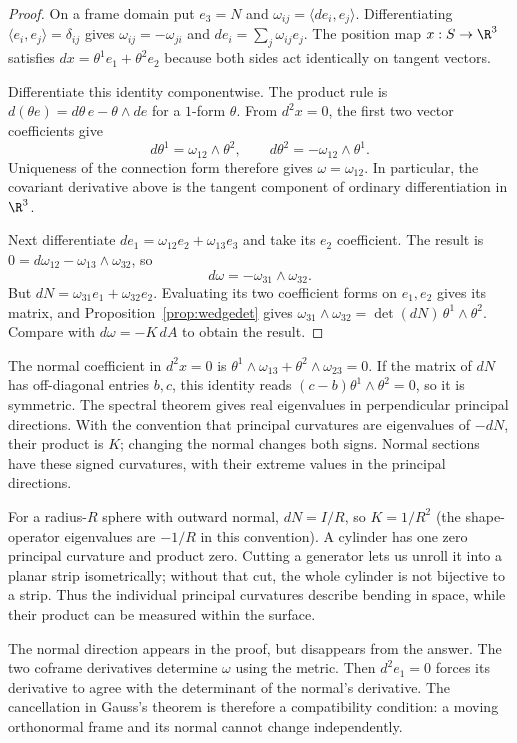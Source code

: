 \begin{proof}
On a frame domain put $e_3=N$ and $\omega_{ij}=\langle de_i,e_j\rangle$. Differentiating $\langle e_i,e_j\rangle=\delta_{ij}$ gives $\omega_{ij}=-\omega_{ji}$ and $de_i=\sum_j\omega_{ij}e_j$. The position map $x:S\to\R^3$ satisfies $dx=\theta^1e_1+\theta^2e_2$ because both sides act identically on tangent vectors.

Differentiate this identity componentwise. The product rule is $d(\theta e)=d\theta\,e-\theta\wedge de$ for a $1$-form $\theta$. From $d^2x=0$, the first two vector coefficients give
\[
d\theta^1=\omega_{12}\wedge\theta^2,\qquad
d\theta^2=-\omega_{12}\wedge\theta^1.
\]
Uniqueness of the connection form therefore gives $\omega=\omega_{12}$. In particular, the covariant derivative above is the tangent component of ordinary differentiation in $\R^3$.

Next differentiate $de_1=\omega_{12}e_2+\omega_{13}e_3$ and take its $e_2$ coefficient. The result is $0=d\omega_{12}-\omega_{13}\wedge\omega_{32}$, so
\[
d\omega=-\omega_{31}\wedge\omega_{32}.
\]
But $dN=\omega_{31}e_1+\omega_{32}e_2$. Evaluating its two coefficient forms on $e_1,e_2$ gives its matrix, and Proposition~\ref{prop:wedgedet} gives
$\omega_{31}\wedge\omega_{32}=\det(dN)\,\theta^1\wedge\theta^2$. Compare with $d\omega=-K\,dA$ to obtain the result.
\end{proof}

The normal coefficient in $d^2x=0$ is $\theta^1\wedge\omega_{13}+\theta^2\wedge\omega_{23}=0$. If the matrix of $dN$ has off-diagonal entries $b,c$, this identity reads $(c-b)\theta^1\wedge\theta^2=0$, so it is symmetric. The spectral theorem gives real eigenvalues in perpendicular principal directions. With the convention that principal curvatures are eigenvalues of $-dN$, their product is $K$; changing the normal changes both signs. Normal sections have these signed curvatures, with their extreme values in the principal directions.

For a radius-$R$ sphere with outward normal, $dN=I/R$, so $K=1/R^2$ (the shape-operator eigenvalues are $-1/R$ in this convention). A cylinder has one zero principal curvature and product zero. Cutting a generator lets us unroll it into a planar strip isometrically; without that cut, the whole cylinder is not bijective to a strip. Thus the individual principal curvatures describe bending in space, while their product can be measured within the surface.

\begin{beauty}
The normal direction appears in the proof, but disappears from the answer. The two coframe derivatives determine $\omega$ using the metric. Then $d^2e_1=0$ forces its derivative to agree with the determinant of the normal's derivative. The cancellation in Gauss's theorem is therefore a compatibility condition: a moving orthonormal frame and its normal cannot change independently.
\end{beauty}

